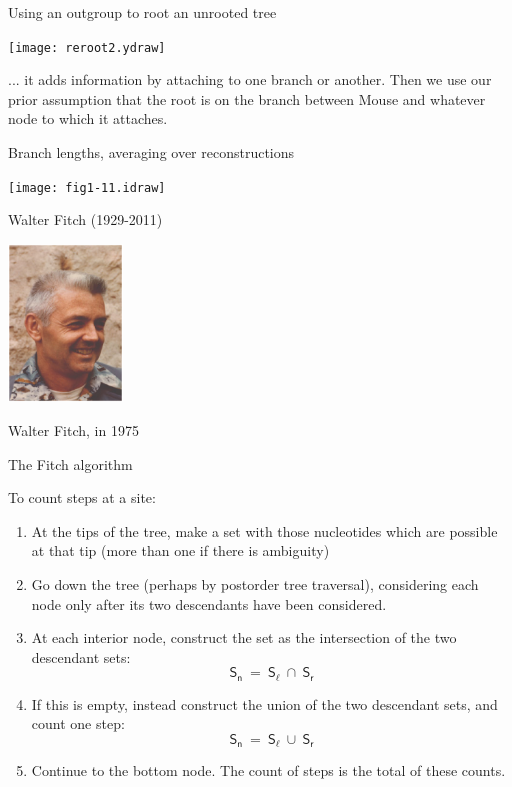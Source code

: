 \documentclass[bluish,slideColor,colorBG,pdf]{prosper}
\begin{document}
\begin{slide}[Replace]{Using an outgroup to root an unrooted tree}
\bigskip

\centerline{\texttt{[image: reroot2.ydraw]}}
\bigskip

... it adds information by attaching to one branch or another.
Then we use our prior assumption that the root is on the branch
between Mouse and whatever node to which it attaches.

\end{slide}

\begin{slide}[Replace]{Branch lengths, averaging over reconstructions}
\vspace{0.4in}

\centerline{\texttt{[image: fig1-11.idraw]}}

\end{slide}

\begin{slide}[Replace]{Walter Fitch (1929-2011) }
\vspace{0.2in}

\centerline{\includegraphics[width=1.2in]{Fitch3a.ps}}
\bigskip

\centerline{Walter Fitch, in 1975}

\end{slide}

\begin{slide}[Replace]{The Fitch algorithm}

To count steps at a site:

\begin{enumerate}
\setlength{\itemsep}{4pt}
\item At the tips of the tree, make a set with those nucleotides which
are possible at that tip (more than one if there is ambiguity)
\item Go down the tree (perhaps by postorder tree traversal), considering
each node only after its two descendants have been considered.
\item At each interior node, construct the set as the intersection of
the two descendant sets:
\[
\mathsf{S_n \  = \  S_\ell \ \cap \ S_r}
\]
\item If this is empty, instead construct the union of the two
descendant sets, and count one step:
\[
\mathsf{S_n \  = \  S_\ell \ \cup \ S_r}
\]
\item Continue to the bottom node.  The count of steps is the total
of these counts.
\end{enumerate}

\end{slide}
\end{document}
